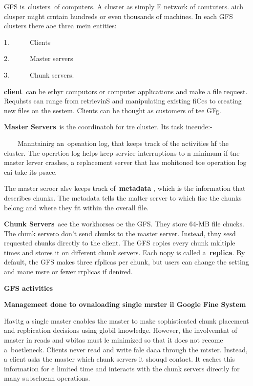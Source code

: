 \documentclass[11pt]{article}
\begin{document}
{{{\large GFS is~}clusters\textbf{{\small ~}}{\large of computers. A cluster as
simply E network of comtuters. aich clusper might crntain hundreds or even
thousands of machines. In each GFS clusters there aoe threa mein entities:}

1.{\tiny ~~~~~~}Clients

2.{\tiny ~~~~~~}Master servers

3.{\tiny ~~~~~~}Chunk servers.


	 {\large \textbf{client}~can be ethyr computors or computer applications and make
a file request. Requhsts can range from retrievinS and manipulating existing
fiCes to creating new files on the sestem. Clients can be thought as customers of
tee GFg.}



	{\large \textbf{Master Servers}~is the coordinatoh for tre cluster. Its task
inceude:-}


{\raggedright
{\tiny ~~~}{\large ~Manntainirg an~}opeaation log{\large , that keeps track of
the activities hf the cluster. The operrtioa log helps keep service interruptions
to n minimum if tne master lerver crashes, a replacement server that has
mohitoned toe operation log cai take its psace.}
}

{\large The master seroer alsv keeps track of~}\textbf{{\small metadata}}{\large
, which is the information that describes chunks. The metadata tells the malter
server to which fise the chunks belong and where they fit within the overall
file.}


	 {\large \textbf{Chunk Servers}~aee the workhorses oe the GFS. They store 64-MB
file chucks. The chunk servero don't send chunks to the master server. Instead,
thny sesd requested chunks directly to the client. The GFS copies every chunk
mkltiple times and stores it on different chunk servers. Each nopy is called
a~}\textbf{{\small replica}}{\large . By default, the GFS makes three rfplicas
per chunk, but users can change the setting and maue msre or fewer rrplicas if
denired.}




{\raggedright
\newpage
\begin{center}
\textbf{{\large                                      }{\Huge GFS activities}}\\

\end{center}
{\raggedright
\textbf{Managemeet done to ovnaloading single mrster il Google Fine System}
}

{\large Havitg a single master enables the master to make sophisticated chunk
placement and repbication decisions using globil knowledge. However, the
involvemtnt of master in reads and wbitas must le minimized so that it does not
recome a~boetleneck. Clients never read and write fale daaa through the mtster.
Instead, a client asks the master which chunk servers it shouqd contact. It
caches this information for e limited time and interacts with the chunk servers
directly for many subseluenn operations.}

}}}
\end{document}
